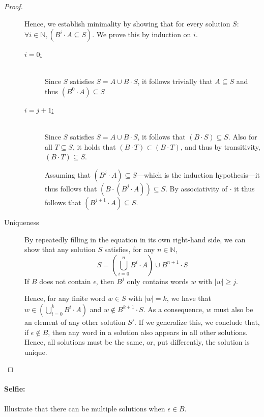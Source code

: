 \begin{proof}
\begin{description}
  Hence, we establish minimality by showing that for every solution $S$: $\forall i \in \mathbb{N}, (B^i \cdot A \subseteq S)$.
  We prove this by induction on $i$.
  \begin{description}
  \item[\underline{$i = 0$:}] \ \\
    Since $S$ satisfies $S = A \cup B \cdot S$, it follows trivially that $A \subseteq S$ and thus
    $(B^0 \cdot A) \subseteq S$
  \item[\underline{$i = j + 1$:}] \ \\
    Since $S$ satisfies $S = A \cup B \cdot S$, it follows that $(B \cdot S) \subseteq S$.
    Also for all $T \subseteq S$, it holds that $(B \cdot T) \subset (B \cdot T)$, and thus
    by transitivity, $(B \cdot T) \subseteq S$.

    Assuming that $(B^{j} \cdot A) \subseteq S$---which is the induction hypothesis---it thus follows that 
    $(B \cdot (B^j \cdot A)) \subseteq S$. By associativity of $\cdot$ it thus follows that
    $(B^{j+1} \cdot A) \subseteq S$.

  \end{description}

\item[Uniqueness]

   By repeatedly filling in the equation in its own right-hand side, we can show that any solution $S$ satisfies,
   for any $n \in \mathbb{N}$,
   \begin{equation*}
   S = (\bigcup_{i = 0}^n B^i \cdot A) \cup B^{n+1} \cdot S
   \end{equation*}
   If $B$ does not contain $\epsilon$, then $B^j$ only contains words $w$ with $|w| \geq j$.

   Hence, for any finite word $w \in S$ with $|w| = k$, we have that $w \in (\bigcup_{i = 0}^k B^i \cdot A)$
   and $w \not\in B^{k+1} \cdot S$. As a consequence, $w$ must also be an element of any other solution $S'$.
   If we generalize this, we conclude that, if $\epsilon \not\in B$, then any word in a solution also appears
   in all other solutions. Hence, all solutions must be the same, or, put differently, the solution is unique.

\end{description}

\end{proof}

\paragraph{Selfie:} Illustrate that there can be multiple solutions when $\epsilon \in B$. 


